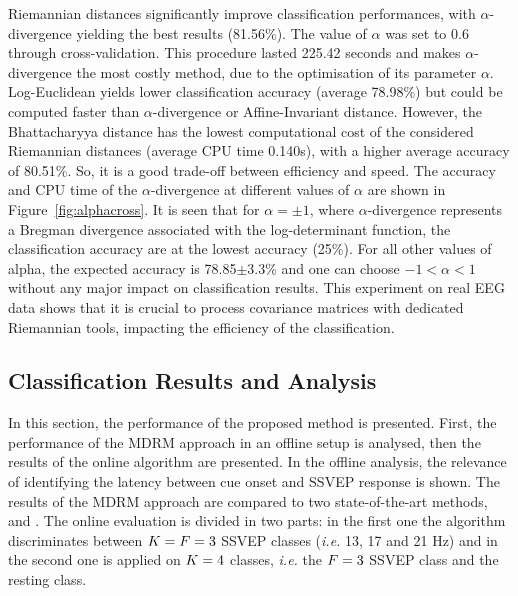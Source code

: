 Riemannian distances significantly improve classification performances, with $\alpha$-divergence yielding the best results (81.56\%). 
The value of $\alpha$ was set to 0.6 through cross-validation. 
This procedure lasted 225.42 seconds and makes $\alpha$-divergence the most costly method, due to the optimisation of its parameter $\alpha$. 
Log-Euclidean yields lower classification accuracy (average 78.98\%) but could be computed faster than $\alpha$-divergence or Affine-Invariant distance.
However, the Bhattacharyya distance has the lowest computational cost of the considered Riemannian distances (average CPU time 0.140s), with a higher average accuracy of 80.51\%. 
So, it is a good trade-off between efficiency and speed. 
The accuracy and CPU time of the $\alpha$-divergence at different values of $\alpha$ are shown in Figure~\ref{fig:alphacross}.
It is seen that for $\alpha = \pm 1$, where $\alpha$-divergence represents a Bregman divergence associated with the log-determinant function, %
the classification accuracy are at the lowest accuracy (25\%). 
For all other values of alpha, the expected accuracy is 78.85$\pm$3.3\% and one can choose $-1 < \alpha < 1$ without any major impact on classification results.
This experiment on real EEG data shows that it is crucial to process covariance matrices with dedicated Riemannian tools, impacting the efficiency of the classification. 

\subsection{Classification Results and Analysis} %
\label{sec:ssvep_response_delay}

In this section, the performance of the proposed method is presented.
First, the performance of the MDRM approach in an offline setup is analysed, then the results of the online algorithm are presented.
In the offline analysis, the relevance of identifying the latency between cue onset and SSVEP response is shown.
The results of the MDRM approach are compared to two state-of-the-art methods, \citep{lin_frequency_2006} and \citep{nakanishi_high-speed_2014}.
The online evaluation is divided in two parts: in the first one the algorithm discriminates between $K=F=3$ SSVEP classes (\textit{i.e.} 13, 17 and 21 Hz) and in the second one is applied on $K=4$ classes, \textit{i.e.} the $F=3$ SSVEP class and the resting class.

